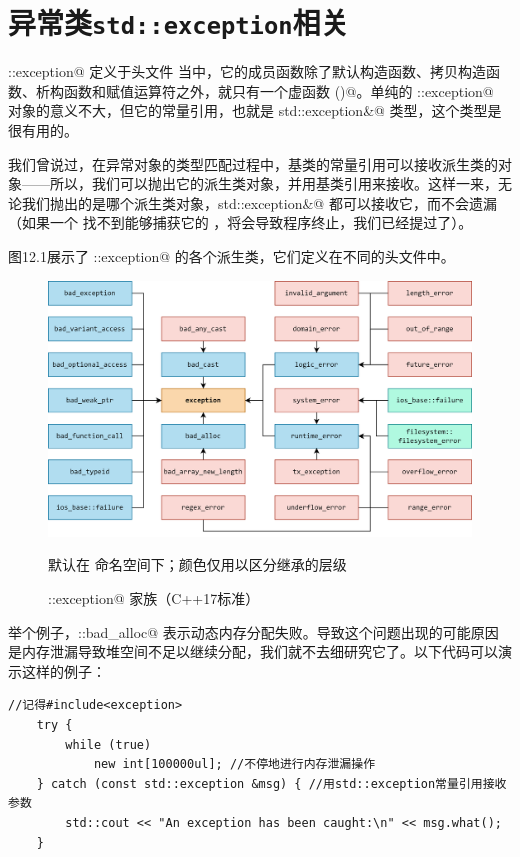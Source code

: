 \section{异常类\texttt{std::exception}相关}
\lstinline@std::exception@ 定义于头文件 \lstinline@exception@ 当中，它的成员函数除了默认构造函数、拷贝构造函数、析构函数和赋值运算符之外，就只有一个虚函数 \lstinline@what()@。单纯的 \lstinline@std::exception@ 对象的意义不大，但它的常量引用，也就是 \lstinline@const std::exception&@ 类型，这个类型是很有用的。\par
我们曾说过，在异常对象的类型匹配过程中，基类的常量引用可以接收派生类的对象——所以，我们可以抛出它的派生类对象，并用基类引用来接收。这样一来，无论我们抛出的是哪个派生类对象，\lstinline@const std::exception&@ 都可以接收它，而不会遗漏（如果一个 \lstinline@throw@ 找不到能够捕获它的 \lstinline@catch@，将会导致程序终止，我们已经提过了）。\par
图12.1展示了 \lstinline@std::exception@ 的各个派生类，它们定义在不同的头文件中。\par
\begin{figure}[htbp]
    \centering
    \includegraphics[width=\textwidth]{../images/generalized_parts/12_std_exception_family.drawio.png}
    \caption{\lstinline@std::exception@ 家族（C++17标准）}
    \footnotesize{默认在 \lstinline@std@ 命名空间下；颜色仅用以区分继承的层级}
\end{figure}
举个例子，\lstinline@std::bad_alloc@ 表示动态内存分配失败。导致这个问题出现的可能原因是内存泄漏导致堆空间不足以继续分配，我们就不去细研究它了。以下代码可以演示这样的例子：
\begin{lstlisting}
//记得#include<exception>
    try {
        while (true)
            new int[100000ul]; //不停地进行内存泄漏操作
    } catch (const std::exception &msg) { //用std::exception常量引用接收参数
        std::cout << "An exception has been caught:\n" << msg.what();
    }
\end{lstlisting}
